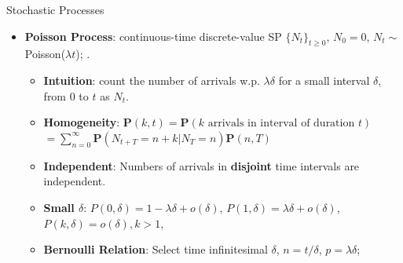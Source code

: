 \documentclass[landscape,a4paper]{article}
\begin{document}
\begin{cheatsheetcolumns}
\begin{card}{Stochastic Processes}
\begin{itemize}
\begin{itemize}
					\item \textbf{Interarrival}: $Y_k=$ time of $k$-th success, $T_1=Y_1$, $T_k=Y_k-Y_{k-1}$;\\ $T_i\sim$ i.i.d. $\operatorname{Geo}(p)$; $Y_k=\sum_{i=1}^kT_i$,
					\item \textbf{Trials until $k$-th success}: $Y_k\sim\operatorname{Pascal}(k,p)$,
					\begin{itemize}
						\item $p_{Y_k}(t)=\C{t-1}{k-1}p^k(1-p)^{t-k}$, $t=k,k+1,\dots$,
						\item $\EE[Y_k]=k/p$, $\var(Y_k)=k(1-p)/p^2$,
					\end{itemize}
					\item \textbf{Failures until $k$-th success}: $Z_k\sim\operatorname{NegBin}(k,p)$,
					\begin{itemize}
						\item $p_{Z_k}(t)=\C{t+k-1}{k-1}p^k(1-p)^{t}$, $t=0,1,2,\dots$,
						\item $\EE[Z_k]=k(1-p)/p$, $\var(Z_k)=k(1-p)/p^2$,
					\end{itemize}
					\item \textbf{Splitting}: keep independently w.p. $q\Rightarrow$ Bernoulli SP($pq$),
					\item \textbf{Merging Independent Bernoullis}:\\ Bernoulli($p$) OR Bernoulli($q$)$\Rightarrow$ Bernoulli($p+q-pq$).
				\end{itemize}
				\item \textbf{Poisson Process}: continuous-time discrete-value SP $\{N_t\}_{t\ge0}$, $N_0=0$, $N_t\sim$ Poisson($\lambda t$); .
				\begin{itemize}
					\item \textbf{Intuition}: count the number of arrivals w.p. $\lambda\delta$ for a small interval $\delta$, from $0$ to $t$ as $N_t$. 
					\item \textbf{Homogeneity}: $\mathbf P(k,t)=\mathbf P(\text{$k$ arrivals in interval of duration $t$})$\\$=\sum_{n=0}^\infty \mathbf P(N_{t+T}=n+k|N_T=n)\mathbf P(n,T)$
					\item \textbf{Independent}: Numbers of arrivals in \textbf{disjoint} time intervals are independent.
					\item \textbf{Small $\delta$}: $P(0,\delta)=1-\lambda\delta+o(\delta)$, $P(1,\delta)=\lambda\delta+o(\delta)$, \\$P(k,\delta)=o(\delta),k>1$,
					\item \textbf{Bernoulli Relation}: Select time infinitesimal $\delta$, $n=t/\delta$, $p=\lambda\delta$;\\

\end{itemize}
\end{itemize}
\end{card}
\end{cheatsheetcolumns}
\end{document}
